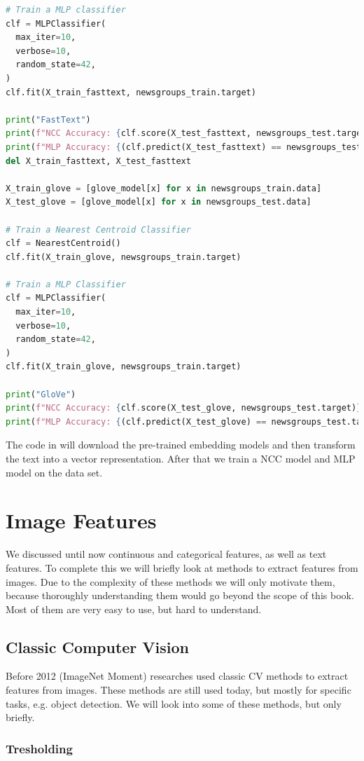\begin{lstlisting}[language=Python, caption={20 newsgroups example with embeddings}, label={code:20-newsgroups-embeddings}]
# Train a MLP classifier
clf = MLPClassifier(
  max_iter=10,
  verbose=10,
  random_state=42,
)
clf.fit(X_train_fasttext, newsgroups_train.target)

print("FastText")
print(f"NCC Accuracy: {clf.score(X_test_fasttext, newsgroups_test.target)}")
print(f"MLP Accuracy: {(clf.predict(X_test_fasttext) == newsgroups_test.target).mean()}")
del X_train_fasttext, X_test_fasttext

X_train_glove = [glove_model[x] for x in newsgroups_train.data]
X_test_glove = [glove_model[x] for x in newsgroups_test.data]

# Train a Nearest Centroid Classifier
clf = NearestCentroid()
clf.fit(X_train_glove, newsgroups_train.target)

# Train a MLP Classifier
clf = MLPClassifier(
  max_iter=10,
  verbose=10,
  random_state=42,
)
clf.fit(X_train_glove, newsgroups_train.target)

print("GloVe")
print(f"NCC Accuracy: {clf.score(X_test_glove, newsgroups_test.target)}")
print(f"MLP Accuracy: {(clf.predict(X_test_glove) == newsgroups_test.target).mean()}")
\end{lstlisting}
The code in  will download the pre-trained embedding models and then transform the text into a vector representation.
After that we train a NCC model and MLP model on the data set.

\section{Image Features}
We discussed until now continuous and categorical features, as well as text features.
To complete this we will briefly look at methods to extract features from images.
Due to the complexity of these methods we will only motivate them, because thoroughly understanding them would go beyond the scope of this book.
Most of them are very easy to use, but hard to understand.

\subsection{Classic Computer Vision}
Before 2012 (ImageNet Moment) researches used classic CV methods to extract features from images.
These methods are still used today, but mostly for specific tasks, e.g. object detection.
We will look into some of these methods, but only briefly.
\subsubsection{Tresholding}
